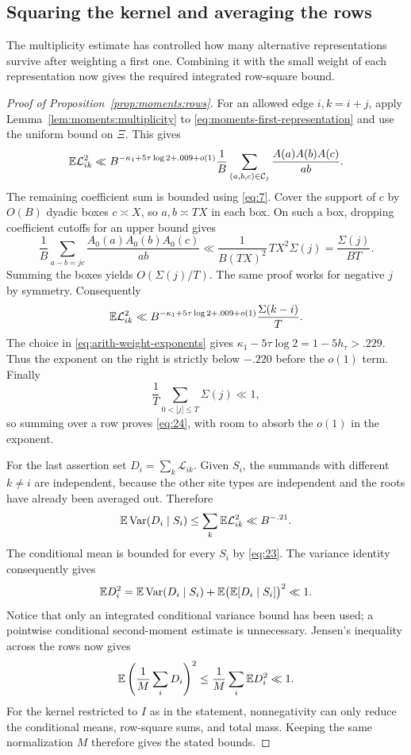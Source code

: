 \subsection{Squaring the kernel and averaging the rows}

The multiplicity estimate has controlled how many alternative
representations survive after weighting a first one. Combining it with
the small weight of each representation now gives the required
integrated row-square bound.

\begin{proof}[Proof of Proposition~\ref{prop:moments:rows}]
For an allowed edge $i,k=i+j$, apply Lemma~\ref{lem:moments:multiplicity} to
\eqref{eq:moments-first-representation} and use the uniform bound on
$\Xi$. This gives
\[
 \mathbb E\mathcal L_{ik}^2
 \ll B^{-\kappa_1+5\tau\log2+.009+o(1)}
 \frac1B\sum_{(a,b,c)\in\mathcal C_j}
       \frac{A(a)A(b)A(c)}{ab}.
\]
The remaining coefficient sum is bounded using
\eqref{eq:7}.  Cover the support of $c$ by $O(B)$ dyadic boxes
$c\asymp X$, so $a,b\asymp TX$ in each box.  On such a box, dropping
coefficient cutoffs for an upper bound gives
\[
 \frac1B\sum_{a-b=jc}\frac{A_0(a)A_0(b)A_0(c)}{ab}
 \ll \frac{1}{B(TX)^2}\,TX^2\Sigma(j)
 =\frac{\Sigma(j)}{BT}.
\]
Summing the boxes yields $O(\Sigma(j)/T)$.  The same proof works for
negative $j$ by symmetry.  Consequently
\[
 \mathbb E\mathcal L_{ik}^{2}
 \ll B^{-\kappa_1+5\tau\log2+.009+o(1)}
                  \frac{\Sigma(k-i)}{T}.
\]
The choice in \eqref{eq:arith-weight-exponents} gives
$\kappa_1-5\tau\log2=1-5h_\tau>.229$.
Thus the exponent on the right is strictly below $-.220$ before the
$o(1)$ term.  Finally
\[
 \frac1T\sum_{0<|j|\le T}\Sigma(j)\ll1,
\]
so summing over a row proves \eqref{eq:24}, with room to absorb the
$o(1)$ in the exponent.

For the last assertion set
$D_i=\sum_k\mathcal L_{ik}$.  Given $S_i$, the summands with different
$k\ne i$ are independent, because the other site types are independent
and the roots have already been averaged out.  Therefore
\[
 \mathbb E\operatorname{Var}(D_i\mid S_i)
 \le\sum_k\mathbb E\mathcal L_{ik}^{2}\ll B^{-.21}.
\]
The conditional mean is bounded for every $S_i$ by \eqref{eq:23}.
The variance identity consequently gives
\[
 \mathbb E D_i^2
 =\mathbb E\operatorname{Var}(D_i\mid S_i)
       +\mathbb E\bigl(\mathbb E[D_i\mid S_i]\bigr)^2\ll1.
\]
Notice that only an integrated conditional variance bound has been
used; a pointwise conditional second-moment estimate is unnecessary.
Jensen's inequality across the rows now gives
\[
 \mathbb E\left(\frac1M\sum_iD_i\right)^2
 \le\frac1M\sum_i\mathbb E D_i^2\ll1.
\]
For the kernel restricted to $I$ as in the statement, nonnegativity can
only reduce the conditional means, row-square sums, and total mass.
Keeping the same normalization $M$ therefore gives the stated bounds.
\end{proof}
